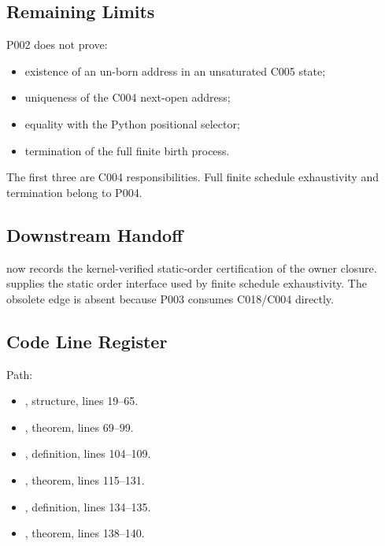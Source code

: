 \subsection{Remaining Limits}\label{remaining-limits-1}

P002 does not prove:

\begin{itemize}
\tightlist
\item
  existence of an un-born address in an unsaturated C005 state;
\item
  uniqueness of the C004 next-open address;
\item
  equality with the Python positional selector;
\item
  termination of the full finite birth process.
\end{itemize}

The first three are C004 responsibilities. Full finite schedule
exhaustivity and termination belong to P004.

\subsection{Downstream Handoff}\label{downstream-handoff-6}

\texttt{\protect{}} now records the
kernel-verified static-order certification of the owner closure.
\texttt{\protect{}} supplies the static order
interface used by finite schedule exhaustivity. The obsolete
\texttt{\protect{}} edge is absent because P003
consumes C018/C004 directly.

\subsection{Code Line Register}\label{code-line-register-1}

Path:
\texttt{\protect{}}

\begin{itemize}
\tightlist
\item
  \texttt{\protect{}}, structure, lines
  19--65.
\item
  \texttt{\protect{}}, theorem, lines
  69--99.
\item
  \texttt{\protect{}}, definition, lines 104--109.
\item
  \texttt{\protect{}}, theorem, lines 115--131.
\item
  \texttt{\protect{}}, definition, lines
  134--135.
\item
  \texttt{\protect{}}, theorem, lines
  138--140.
\end{itemize}

